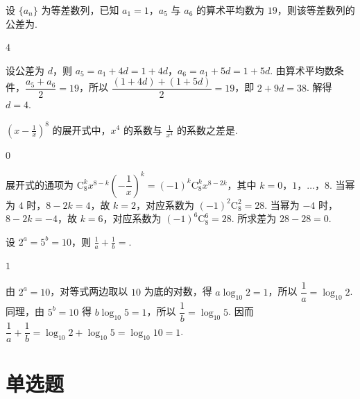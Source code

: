 \documentclass[UTF8,a4paper,oneside,11pt]{ctexbook}
\begin{document}
\begin{problem}
设 \(\{a_n\}\) 为等差数列，已知 \(a_1=1\)，\(a_5\) 与 \(a_6\) 的算术平均数为 \(19\)，则该等差数列的公差为\fillinblank{}.
\end{problem}

\begin{answer}
\(4\)
\end{answer}

\begin{solution}
设公差为 \(d\)，则 \(a_5=a_1+4d=1+4d\)，\(a_6=a_1+5d=1+5d\). 由算术平均数条件，\(\dfrac{a_5+a_6}{2}=19\)，所以
\(\dfrac{(1+4d)+(1+5d)}{2}=19\)，即 \(2+9d=38\). 解得 \(d=4\).
\end{solution}

\begin{problem}
\(\left(x-\frac{1}{x}\right)^8\) 的展开式中，\(x^4\) 的系数与 \(\frac{1}{x^4}\) 的系数之差是\fillinblank{}.
\end{problem}

\begin{answer}
\(0\)
\end{answer}

\begin{solution}
展开式的通项为 \(\mathrm C_8^k x^{8-k}\left(-\dfrac1x\right)^k=(-1)^k\mathrm C_8^k x^{8-2k}\)，其中 \(k=0\)，\(1\)，\(\dots\)，\(8\). 当幂为 \(4\) 时，\(8-2k=4\)，故 \(k=2\)，对应系数为 \((-1)^2\mathrm C_8^2=28\). 当幂为 \(-4\) 时，\(8-2k=-4\)，故 \(k=6\)，对应系数为 \((-1)^6\mathrm C_8^6=28\). 所求差为 \(28-28=0\).
\end{solution}

\begin{problem}
设 \(2^a=5^b=10\)，则 \(\frac{1}{a}+\frac{1}{b}=\)\fillinblank{}.
\end{problem}

\begin{answer}
\(1\)
\end{answer}

\begin{solution}
由 \(2^a=10\)，对等式两边取以 \(10\) 为底的对数，得 \(a\log_{10}2=1\)，所以 \(\dfrac1a=\log_{10}2\). 同理，由 \(5^b=10\) 得 \(b\log_{10}5=1\)，所以 \(\dfrac1b=\log_{10}5\). 因而
\(\dfrac1a+\dfrac1b=\log_{10}2+\log_{10}5=\log_{10}10=1\).
\end{solution}

\section{单选题}
\end{document}
